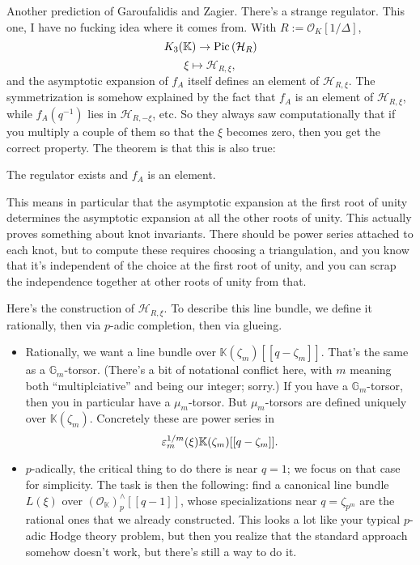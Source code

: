 \documentclass[reqno]{amsart} 
\begin{document}
Another prediction of Garoufalidis and Zagier.  There's a strange regulator.  This one, I have no fucking idea where it comes from.  With $R := \mathcal{O}_K[1/ \Delta]$,
\begin{equation*}
  K_3(\mathbb{K} ) \rightarrow \operatorname{Pic} \left( \mathcal{H}_{R} \right)
\end{equation*}
\begin{equation*}
  \xi \mapsto \mathcal{H}_{R, \xi},
\end{equation*}
and the asymptotic expansion of $f_A$ itself defines an element of $\mathcal{H}_{R, \xi}$.  The symmetrization is somehow explained by the fact that $f_A$ is an element of $\mathcal{H}_{R, \xi}$, while $f_A(q^{-1})$ lies in $\mathcal{H}_{R, -\xi}$, etc.  So they always saw computationally that if you multiply a couple of them so that the $\xi$ becomes zero, then you get the correct property.  The theorem is that this is also true:
\begin{theorem}
  The regulator exists and $f_A$ is an element.
\end{theorem}
This means in particular that the asymptotic expansion at the first root of unity determines the asymptotic expansion at all the other roots of unity.  This actually proves something about knot invariants.  There should be power series attached to each knot, but to compute these requires choosing a triangulation, and you know that it's independent of the choice at the first root of unity, and you can scrap the independence together at other roots of unity from that.

Here's the construction of $\mathcal{H}_{R, \xi}$.  To describe this line bundle, we define it rationally, then via $p$-adic completion, then via glueing.
\begin{itemize}
\item Rationally, we want a line bundle over $\mathbb{K}(\zeta_m)[[q - \zeta_m]]$.  That's the same as a $\mathbb{G}_m$-torsor.  (There's a bit of notational conflict here, with $m$ meaning both ``multiplciative'' and being our integer; sorry.)  If you have a $\mathbb{G}_m$-torsor, then you in particular have a $\mu_m$-torsor.  But $\mu_m$-torsors are defined uniquely over $\mathbb{K}(\zeta_m)$.  Concretely these are power series in
  \begin{equation*}
    \varepsilon_m^{1/m}(\xi) \mathbb{K}(\zeta_m)[[q - \zeta_m]].
  \end{equation*}
\item $p$-adically, the critical thing to do there is near $q = 1$; we focus on that case for simplicity.  The task is then the following: find a canonical line bundle $L(\xi)$ over $(\mathcal{O}_{\mathbb{K} })_p^\wedge[[q - 1]]$, whose specializations near $q = \zeta_{p^m}$ are the rational ones that we already constructed.  This looks a lot like your typical $p$-adic Hodge theory problem, but then you realize that the standard approach somehow doesn't work, but there's still a way to do it.
\end{itemize}
\end{document}
